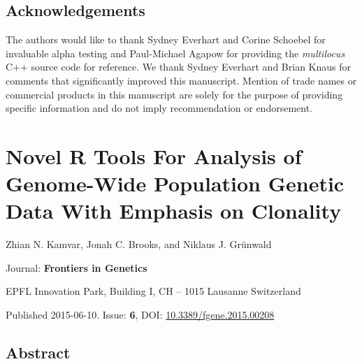\documentclass[double,11pt]{beavtex}
\begin{document}
  \section{Acknowledgements}\label{acknowledgements}
  
  The authors would like to thank Sydney Everhart and Corine Schoebel for
  invaluable alpha testing and Paul-Michael Agapow for providing the
  \emph{multilocus} C++ source code for reference. We thank Sydney
  Everhart and Brian Knaus for comments that significantly improved this
  manuscript. Mention of trade names or commercial products in this
  manuscript are solely for the purpose of providing specific information
  and do not imply recommendation or endorsement.
  
  \chapter{Novel R Tools For Analysis of Genome-Wide Population Genetic
  Data With Emphasis on
  Clonality}\label{novel-r-tools-for-analysis-of-genome-wide-population-genetic-data-with-emphasis-on-clonality}
  
  \singlespacing
  
  \begin{center}
  
  Zhian N. Kamvar, Jonah C. Brooks, and Niklaus J. Grünwald
  
  
  
  \end{center}\vspace*{\fill}
  
  Journal: \textbf{Frontiers in Genetics}
  
  EPFL Innovation Park, Building I, CH -- 1015 Lausanne Switzerland
  
  Published 2015-06-10. Issue: \textbf{6}, DOI:
  \href{http://dx.doi.org/10.3389/fgene.2015.00208}{10.3389/fgene.2015.00208}
  
  \doublespacing
  \newpage
  
  \section{Abstract}\label{abstract-1}
  
\end{document}
